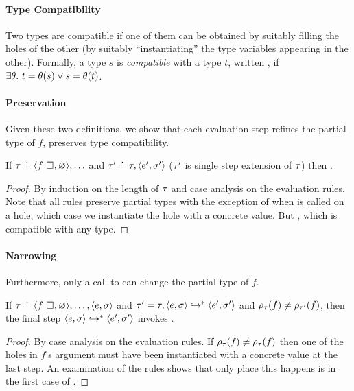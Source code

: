 \paragraph{Type Compatibility}
Two types are compatible if one of them can be obtained by
suitably filling the holes of the other (\ie by suitably ``instantiating''
the type variables appearing in the other). Formally, a type $s$ is
\emph{compatible} with a type $t$, written , if
$\exists \theta.\ t = \theta(s) \lor s = \theta(t)$.

\paragraph{Preservation}
Given these two definitions, we show that each evaluation step
refines the partial type of $f$, \ie preserves type compatibility.
%
\begin{lem}
\label{lem:refine-partial}
If $\tau \doteq \langle f \ \square_{}, \varnothing \rangle,\ldots$ and
$\tau' \doteq \tau, \langle e', \sigma' \rangle$ (\ie $\tau'$ is single
step extension of $\tau$)
%
%
then .
\end{lem}
\begin{proof}
  By induction on the length of $\tau$ and case analysis on the evaluation rules.
  Note that all rules preserve partial types with the exception of when
  \forcesym is called on a hole, which case we instantiate the hole with
  a concrete value.
  But \hastype{\ehole{}}{\thole{}}, which is compatible with any type.
\end{proof}

\paragraph{Narrowing}
%
Furthermore, only a call to \forcesym can change the partial type of $f$.
%
\begin{lem}
\label{lem:force-inst}
If
$\tau \doteq \langle f \ \square_{}, \varnothing \rangle, \ldots,\langle e, \sigma \rangle$
and
$\tau' = \tau, \langle e, \sigma \rangle \hookrightarrow^{*} \langle e', \sigma' \rangle$
and
$\rho_{\tau}(f) \neq \rho_{\tau'}(f)$,
then the final step $\langle e, \sigma \rangle \hookrightarrow^{*} \langle e', \sigma' \rangle$ invokes \forcesym.
\end{lem}

\begin{proof}
  By case analysis on the evaluation rules.
  If $\rho_{\tau}(f) \neq \rho_{\tau}(f)$ then one of the holes in $f$'s
  argument must have been instantiated with a concrete value at the last step.
  An examination of the rules shows that only place this happens is
  in the first case of \forcesym.
\end{proof}

